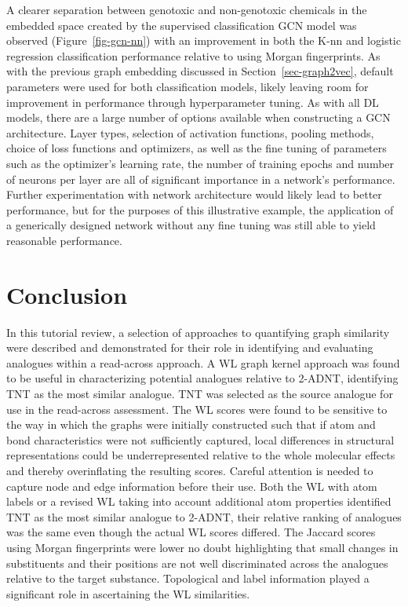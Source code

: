 \documentclass[
  super,
  preprint,
  3p]{elsarticle}
\begin{document}
A clearer separation between genotoxic and non-genotoxic chemicals in
the embedded space created by the supervised classification GCN model
was observed (Figure~\ref{fig-gcn-nn}) with an improvement in both the
K-nn and logistic regression classification performance relative to
using Morgan fingerprints. As with the previous graph embedding
discussed in Section~\ref{sec-graph2vec}, default parameters were used
for both classification models, likely leaving room for improvement in
performance through hyperparameter tuning. As with all DL models, there
are a large number of options available when constructing a GCN
architecture. Layer types, selection of activation functions, pooling
methods, choice of loss functions and optimizers, as well as the fine
tuning of parameters such as the optimizer's learning rate, the number
of training epochs and number of neurons per layer are all of
significant importance in a network's performance. Further
experimentation with network architecture would likely lead to better
performance, but for the purposes of this illustrative example, the
application of a generically designed network without any fine tuning
was still able to yield reasonable performance.

\section{Conclusion}\label{conclusion}

In this tutorial review, a selection of approaches to quantifying graph
similarity were described and demonstrated for their role in identifying
and evaluating analogues within a read-across approach. A WL graph
kernel approach was found to be useful in characterizing potential
analogues relative to 2-ADNT, identifying TNT as the most similar
analogue. TNT was selected as the source analogue for use in the
read-across assessment. The WL scores were found to be sensitive to the
way in which the graphs were initially constructed such that if atom and
bond characteristics were not sufficiently captured, local differences
in structural representations could be underrepresented relative to the
whole molecular effects and thereby overinflating the resulting scores.
Careful attention is needed to capture node and edge information before
their use. Both the WL with atom labels or a revised WL taking into
account additional atom properties identified TNT as the most similar
analogue to 2-ADNT, their relative ranking of analogues was the same
even though the actual WL scores differed. The Jaccard scores using
Morgan fingerprints were lower no doubt highlighting that small changes
in substituents and their positions are not well discriminated across
the analogues relative to the target substance. Topological and label
information played a significant role in ascertaining the WL
similarities.
\end{document}

